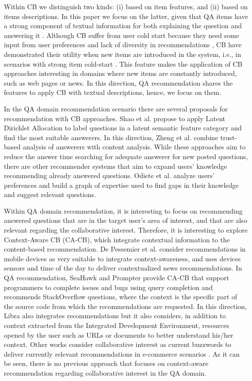 \documentclass[preprint]{elsarticle}
\begin{document}
\begin{spacing}{1.5}
Within CB we distinguish two kinds: (i) based on item features, and (ii) based on items descriptions. In this paper we focus on the latter, given that QA items have a strong component of textual information for both explaining the question and answering it \cite{Figueroa2016}. Although CB suffer from user cold start because they need some input from user preferences and lack of diversity in recommendations \cite{Barragans2010}, CB have demonstrated their utility when new items are introduced in the system, i.e., in scenarios with strong item cold-start \cite{Aggarwal2016}. This feature makes the application of CB approaches interesting in domains where new items are constantly introduced, such as web pages or news. In this direction, QA recommendation shares the features to apply CB with textual descriptions, hence, we focus on them.

In the QA domain recommendation scenario there are several proposals for recommendation with CB approaches. Shao et al.\cite{Shao2017} propose to apply Latent Dirichlet Allocation to label questions in a latent semantic feature category and find the most suitable answerers. In this direction, Zheng et al. \cite{Zheng2015b} combine trust-based analysis of answerers with content analysis. While these approaches aim to reduce the answer time searching for adequate answerer for new posted questions, there are other recommender systems that aim to expand users' knowledge recommending already answered questions. Odiete et al. \cite{Odiete2017} analyze users' preferences and build a graph of expertise used to find gaps in their knowledge and suggest relevant questions.

Within QA domain recommendation, it is interesting to focus on recommending answered questions that are in the target user's area of interest, and that are also relevant regarding the collaborative interest. Therefore, it is interesting to explore Context-Aware CB (CA-CB), which integrate contextual information to the content-based recommendation. De Pessemier et al. \cite{DePessemier2016} consider recommendations in mobile devices as very suitable to integrate context-awareness, and uses devices sensors and time of the day to deliver contextualized news recommendations. In QA recommendation, SeaHawk \cite{Ponzanelli2014} and Prompter \cite{Ponzanelli2014b} provide CA-CB that support programmers to complete issues and bugs using query completion and recommends StackOverflow questions, where the context is the specific part of the source code from which the recommendations are requested. In this direction, Libra \cite{Ponzanelli2017} also integrates recommendations but it also considers, in addition to context extracted from the Integrated Development Environment, resources opened by the user such as URLs or documents to better understand his/her context. Other works consider collaborative interest as current buzzwords to deliver currently relevant recommendations in e-commerce scenarios \cite{Parikh2009}. As it can be seen, there is no previous approach that focuses on context-aware recommendation regarding collaborative interest in the QA domain.


\end{spacing}
\end{document}
